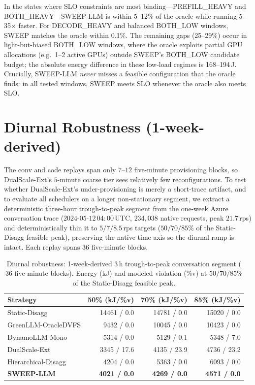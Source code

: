 In the states where SLO constraints are most binding—PREFILL\_HEAVY and BOTH\_HEAVY—SWEEP-LLM is within 5--12\% of the oracle while running 5--35$\times$ faster.
For DECODE\_HEAVY and balanced BOTH\_LOW windows, SWEEP matches the oracle within 0.1\%.
The remaining gaps (25--29\%) occur in light-but-biased BOTH\_LOW windows, where the oracle exploits partial GPU allocations (e.g.\ 1--2 active GPUs) outside SWEEP's BOTH\_LOW candidate budget; the absolute energy difference in these low-load regimes is 168--194\,J.
Crucially, SWEEP-LLM \emph{never} misses a feasible configuration that the oracle finds: in all tested windows, SWEEP meets SLO whenever the oracle also meets SLO.


\section{Diurnal Robustness (1-week-derived)}
\label{sec:prod_diurnal}

The conv and code replays span only $7$--$12$ five-minute provisioning blocks, so DualScale-Ext's $5$-minute coarse tier sees relatively few reconfigurations. To test whether DualScale-Ext's under-provisioning is merely a short-trace artifact, and to evaluate all schedulers on a longer non-stationary segment, we extract a deterministic three-hour trough-to-peak segment from the one-week Azure conversation trace ($2024$-$05$-$12$\,$04{:}00$\,UTC, $234{,}038$ native requests, peak $21.7$\,rps) and deterministically thin it to $5/7/8.5$\,rps targets ($50/70/85\%$ of the Static-Disagg feasible peak), preserving the native time axis so the diurnal ramp is intact. Each replay spans $36$ five-minute blocks.

\begin{table}[t]
\centering
\caption{Diurnal robustness: 1-week-derived $3$\,h trough-to-peak conversation segment ($36$ five-minute blocks). Energy (kJ) and modeled violation (\%v) at $50/70/85\%$ of the Static-Disagg feasible peak.}
\label{tab:prod_diurnal}
\small
\setlength{\tabcolsep}{5pt}
\begin{tabular}{@{}lrrr@{}}
\toprule
Strategy & 50\% (kJ/\%v) & 70\% (kJ/\%v) & 85\% (kJ/\%v) \\
\midrule
Static-Disagg        & 14461 / 0.0 & 14781 / 0.0 & 15020 / 0.0 \\
GreenLLM-OracleDVFS  & 9432 / 0.0  & 10045 / 0.0 & 10423 / 0.0 \\
DynamoLLM-Mono       & 5314 / 0.0  & 5129 / 0.1  & 5348 / 7.0 \\
DualScale-Ext        & 3345 / 17.6 & 4135 / 23.9 & 4736 / 23.2 \\
Hierarchical-Disagg  & 4204 / 0.0  & 5363 / 0.0  & 6093 / 0.0 \\
\textbf{SWEEP-LLM}   & \textbf{4021 / 0.0} & \textbf{4269 / 0.0} & \textbf{4571 / 0.0} \\
\bottomrule
\end{tabular}
\end{table}

